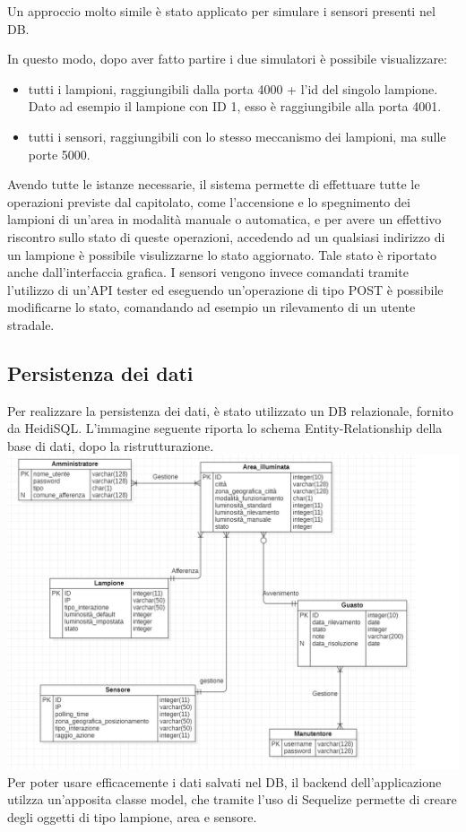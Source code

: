 \documentclass[12pt]{article}
\begin{document}
Un approccio molto simile è stato applicato per simulare i sensori presenti nel DB.

In questo modo, dopo aver fatto partire i due simulatori è possibile visualizzare:
\begin{itemize}
	\item tutti i lampioni, raggiungibili dalla porta 4000 + l'id del singolo lampione. Dato ad esempio il lampione con ID 1, esso è raggiungibile alla porta 4001.
	\item tutti i sensori, raggiungibili con lo stesso meccanismo dei lampioni, ma sulle porte 5000.
\end{itemize}

Avendo tutte le istanze necessarie, il sistema permette di effettuare tutte le operazioni previste dal capitolato, come l'accensione e lo spegnimento dei lampioni di un'area in modalità manuale o automatica, e per avere un effettivo riscontro sullo stato di queste operazioni, accedendo ad un qualsiasi indirizzo di un lampione è possibile visulizzarne lo stato aggiornato. Tale stato è riportato anche dall'interfaccia grafica.
I sensori vengono invece comandati tramite l'utilizzo di un'API tester ed eseguendo un'operazione di tipo POST è possibile modificarne lo stato, comandando ad esempio un rilevamento di un utente stradale.
\subsection{Persistenza dei dati}
Per realizzare la persistenza dei dati, è stato utilizzato un DB relazionale, fornito da HeidiSQL.
L'immagine seguente riporta lo schema Entity-Relationship della base di dati, dopo la ristrutturazione.
\clearpage
\includegraphics[width=450pt]{er ristrutturato.png}
Per poter usare efficacemente i dati salvati nel DB, il backend dell'applicazione utilzza un'apposita classe model, che tramite l'uso di Sequelize permette di creare degli oggetti di tipo lampione, area e sensore.
\end{document}
